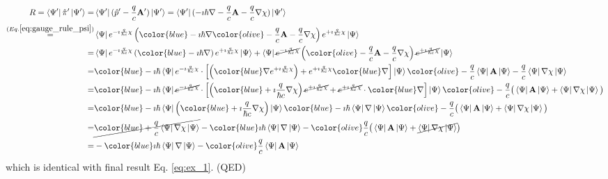 \documentclass[11pt]{article}
\begin{document}
\begin{align*}
 R= \bra{\Psi'} \hat \pi' \ket{\Psi'}  =&  \bra{\Psi'} (\hat p' - \frac{q}{c} \vb A') \ket{\Psi'}  = \bra{\Psi'} (-\imath \hbar \nabla - \frac{q}{c} \vb A -\frac{q}{c} \nabla \chi ) \ket{\Psi'} \\
  \stackrel{ (Eq. \ref{eq:gauge_rule_psi}) }{=} &  
  \bra{\Psi}e^{ -\imath \frac{q}{\hbar c} \chi} \left( {\color{blue} -\imath \hbar \nabla } {\color{olive}  - \frac{q}{c} \vb A -\frac{q}{c} \nabla \chi } \right)  e^{+\imath \frac{q}{\hbar c} \chi}  \ket{\Psi} \\
  = &  
   \bra{\Psi}e^{-\imath \frac{q}{\hbar c} \chi} \left( {\color{blue} -\imath \hbar \nabla } \right)  e^{+\imath \frac{q}{\hbar c} \chi}  \ket{\Psi} 
   +
    \bra{\Psi} \cancel{e^{-\imath \frac{q}{\hbar c} \chi} }\left( {\color{olive}   - \frac{q}{c} \vb A -\frac{q}{c} \nabla \chi} \right) \cancel{ e^{+\imath \frac{q}{\hbar c} \chi} } \ket{\Psi} \\
=&  {\color{blue} -\imath \hbar }\bra{\Psi}e^{-\imath \frac{q}{\hbar c} \chi} 
    \cdot    \left[ \left(  {\color{blue} \nabla}   e^{+\imath \frac{q}{\hbar c} \chi}  \right)  +   e^{+\imath \frac{q}{\hbar c} \chi} {\color{blue} \nabla}  \right]\ket{\Psi} 
    {\color{olive} 
    - \frac{q}{c} \bra{\Psi} \vb A  \ket{\Psi} 
    - \frac{q}{c} \bra{\Psi} \nabla \chi  \ket{\Psi}}  \\
=&   {\color{blue}   -\imath \hbar }
    \bra{\Psi}   \cancel{ e^{-\imath \frac{q}{\hbar c} \chi}} 
        \cdot    \left[ \left({\color{blue} +\imath \frac{q}{\hbar c} \nabla \chi } \right) \cancel{ e^{+\imath \frac{q}{\hbar c} \chi} } +  
    \cancel{  e^{+\imath \frac{q}{\hbar c} \chi} }\cdot {\color{blue} \nabla}     \right] \ket{\Psi}
     {\color{olive} 
    - \frac{q}{c} \big(\bra{\Psi} \vb A  \ket{\Psi}  + \bra{\Psi} \nabla \chi  \ket{\Psi} \big)}  \\     
=&  {\color{blue}   -\imath \hbar } \bra {\Psi} \left({\color{blue} +\imath \frac{q}{\hbar c} \nabla \chi } \right) \ket{\Psi}  
 {\color{blue}   -\imath \hbar } \bra {\Psi} { \nabla}  \ket{\Psi} 
      {\color{olive} 
    - \frac{q}{c} \big(\bra{\Psi} \vb A  \ket{\Psi}  + \bra{\Psi} \nabla \chi  \ket{\Psi} \big)}  \\  
=&   \cancel{  {\color{blue} + \frac{q}{c} }\bra{\Psi} \nabla \chi \ket{\Psi} }
 -    {\color{blue}   \imath \hbar } \bra {\Psi} { \nabla}  \ket{\Psi} 
 - {\color{olive} 
     \frac{q}{c} \big(\bra{\Psi} \vb A  \ket{\Psi}  + \cancel{\bra{\Psi} \nabla \chi  \ket{\Psi} }\big)} \\
=&   -  {\color{blue}   \imath \hbar } \bra {\Psi} { \nabla}  \ket{\Psi} 
     -  {\color{olive}  \frac{q}{c} \bra{\Psi} \vb A  \ket{\Psi} }
\end{align*}
which is identical with final result Eq. \ref{eq:ex_1}. (QED)
\end{document}
